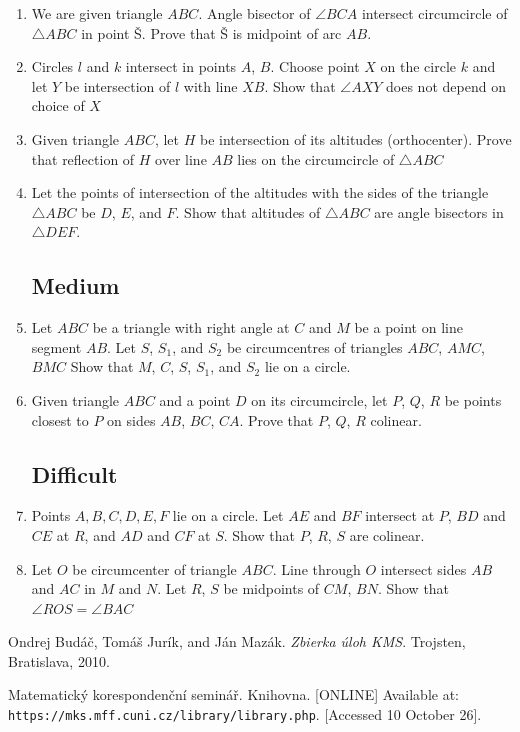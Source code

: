 \documentclass[11pt,a5paper]{article}
\begin{document}
\begin{enumerate}
	\item{We are given triangle $ABC$. Angle bisector of $\angle BCA$} intersect circumcircle of $\triangle ABC$ in point \v{S}. Prove that \v{S} is midpoint of arc $AB$.
	
	\item{Circles $l$ and $k$ intersect in points $A$, $B$. Choose point $X$ on the circle $k$ and let $Y$ be intersection of $l$ with line $XB$. Show that $\angle AXY$ does not depend on choice of $X$}
	
	\item{Given triangle $ABC$, let $H$ be intersection of its altitudes (orthocenter). Prove that reflection of $H$ over line $AB$ lies on the circumcircle of $\triangle ABC$}
	
	\item{Let the points of intersection of the altitudes with the sides of the triangle $\triangle ABC$ be $D$, $E$, and $F$. Show that altitudes of $\triangle ABC$ are angle bisectors in $\triangle DEF$.}
	
	\subsection*{Medium}
	\item{Let $ABC$ be a triangle with right angle at $C$ and $M$ be a point on line segment $AB$. Let $S$, $S_1$, and $S_2$ be circumcentres of triangles $ABC$, $ AMC$, $BMC$ Show that $M$, $C$, $S$, $S_1$, and $S_2$ lie on a circle. }
		
	\item{Given triangle $ABC$ and a point $D$ on its circumcircle, let $P$, $Q$, $R$ be points closest to $P$ on sides $AB$, $BC$, $CA$. Prove that $P$, $Q$, $R$ colinear.}
	
	
	
	\subsection*{Difficult}
	
	\item{Points $A, B, C, D, E, F$ lie on a circle. Let $AE$ and $BF$ intersect at $P$, $BD$ and $CE$ at $R$, and $AD$ and $CF$ at $S$. Show that $P$, $R$, $S$ are colinear.}
	
	\item{Let $O$ be circumcenter of triangle $ABC$. Line through $O$ intersect sides $AB$ and $AC$ in $M$ and $N$. Let $R$, $S$ be midpoints of $CM$, $BN$. Show that $\angle ROS = \angle BAC$}

\end{enumerate}

\begin{thebibliography}{9}
 Ondrej Budáč, Tomáš Jurík, and Ján Mazák. 
	\emph{Zbierka úloh KMS}. Trojsten, Bratislava, 2010.
	
 Matematický korespondenční seminář. Knihovna. [ONLINE] Available at: \texttt{https://mks.mff.cuni.cz/library/library.php}. [Accessed 10 October 26].
\end{thebibliography}
\end{document}
